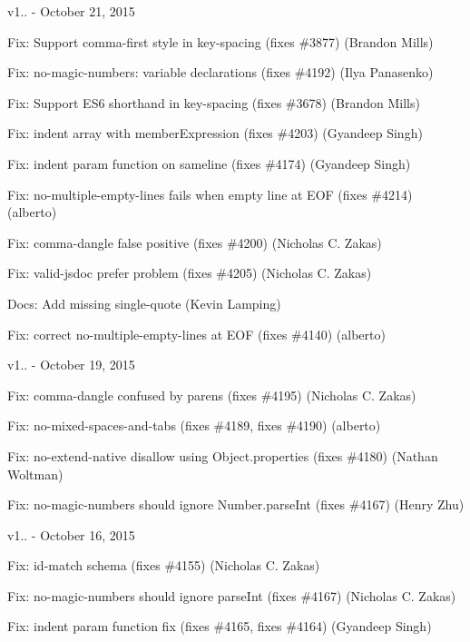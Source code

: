 v1.. -\/ October 21, 2015


\begin{DoxyItemize}
\item Fix\+: Support comma-\/first style in key-\/spacing (fixes \#3877) (Brandon Mills)
\item Fix\+: no-\/magic-\/numbers\+: variable declarations (fixes \#4192) (Ilya Panasenko)
\item Fix\+: Support E\+S6 shorthand in key-\/spacing (fixes \#3678) (Brandon Mills)
\item Fix\+: {\ttfamily indent} array with member\+Expression (fixes \#4203) (Gyandeep Singh)
\item Fix\+: {\ttfamily indent} param function on sameline (fixes \#4174) (Gyandeep Singh)
\item Fix\+: no-\/multiple-\/empty-\/lines fails when empty line at E\+OF (fixes \#4214) (alberto)
\item Fix\+: {\ttfamily comma-\/dangle} false positive (fixes \#4200) (Nicholas C. Zakas)
\item Fix\+: {\ttfamily valid-\/jsdoc} prefer problem (fixes \#4205) (Nicholas C. Zakas)
\item Docs\+: Add missing single-\/quote (Kevin Lamping)
\item Fix\+: correct no-\/multiple-\/empty-\/lines at E\+OF (fixes \#4140) (alberto)
\end{DoxyItemize}

v1.. -\/ October 19, 2015


\begin{DoxyItemize}
\item Fix\+: comma-\/dangle confused by parens (fixes \#4195) (Nicholas C. Zakas)
\item Fix\+: no-\/mixed-\/spaces-\/and-\/tabs (fixes \#4189, fixes \#4190) (alberto)
\item Fix\+: no-\/extend-\/native disallow using Object.\+properties (fixes \#4180) (Nathan Woltman)
\item Fix\+: no-\/magic-\/numbers should ignore Number.\+parse\+Int (fixes \#4167) (Henry Zhu)
\end{DoxyItemize}

v1.. -\/ October 16, 2015


\begin{DoxyItemize}
\item Fix\+: id-\/match schema (fixes \#4155) (Nicholas C. Zakas)
\item Fix\+: no-\/magic-\/numbers should ignore parse\+Int (fixes \#4167) (Nicholas C. Zakas)
\item Fix\+: {\ttfamily indent} param function fix (fixes \#4165, fixes \#4164) (Gyandeep Singh)
\end{DoxyItemize}


